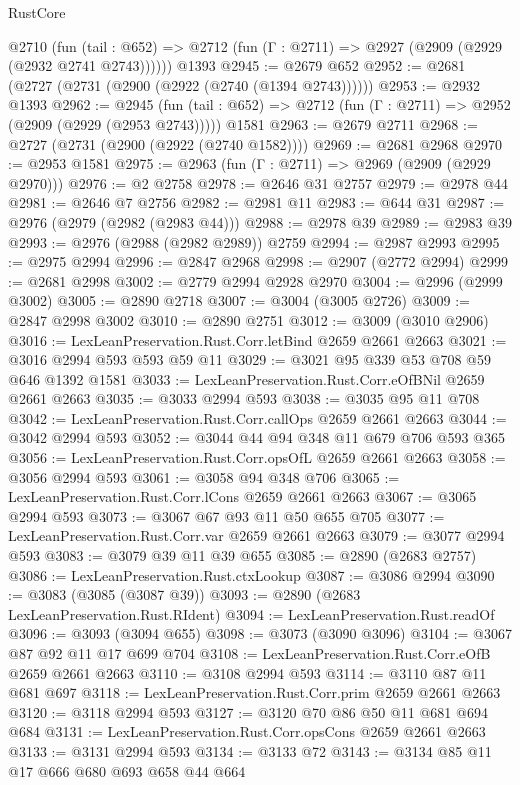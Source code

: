\begin{lexlean}{RustCore}
\begin{coremodule}
    @2710
      (fun (tail : @652) => @2712 (fun (Γ : @2711) => @2927 (@2909 (@2929 (@2932 @2741 @2743))))))
    @1393
@2945 := @2679 @652
@2952 := @2681 (@2727 (@2731 (@2900 (@2922 (@2740 (@1394 @2743))))))
@2953 := @2932 @1393
@2962 := @2945
    (fun (tail : @652) => @2712 (fun (Γ : @2711) => @2952 (@2909 (@2929 (@2953 @2743)))))
    @1581
@2963 := @2679 @2711
@2968 := @2727 (@2731 (@2900 (@2922 (@2740 @1582))))
@2969 := @2681 @2968
@2970 := @2953 @1581
@2975 := @2963 (fun (Γ : @2711) => @2969 (@2909 (@2929 @2970)))
@2976 := @2 @2758
@2978 := @2646 @31 @2757
@2979 := @2978 @44
@2981 := @2646 @7 @2756
@2982 := @2981 @11
@2983 := @644 @31
@2987 := @2976 (@2979 (@2982 (@2983 @44)))
@2988 := @2978 @39
@2989 := @2983 @39
@2993 := @2976 (@2988 (@2982 @2989)) @2759
@2994 := @2987 @2993
@2995 := @2975 @2994
@2996 := @2847 @2968
@2998 := @2907 (@2772 @2994)
@2999 := @2681 @2998
@3002 := @2779 @2994 @2928 @2970
@3004 := @2996 (@2999 @3002)
@3005 := @2890 @2718
@3007 := @3004 (@3005 @2726)
@3009 := @2847 @2998 @3002
@3010 := @2890 @2751
@3012 := @3009 (@3010 @2906)
@3016 := LexLeanPreservation.Rust.Corr.letBind @2659 @2661 @2663
@3021 := @3016 @2994 @593 @593 @59 @11
@3029 := @3021 @95 @339 @53 @708 @59 @646 @1392 @1581
@3033 := LexLeanPreservation.Rust.Corr.eOfBNil @2659 @2661 @2663
@3035 := @3033 @2994 @593
@3038 := @3035 @95 @11 @708
@3042 := LexLeanPreservation.Rust.Corr.callOps @2659 @2661 @2663
@3044 := @3042 @2994 @593
@3052 := @3044 @44 @94 @348 @11 @679 @706 @593 @365
@3056 := LexLeanPreservation.Rust.Corr.opsOfL @2659 @2661 @2663
@3058 := @3056 @2994 @593
@3061 := @3058 @94 @348 @706
@3065 := LexLeanPreservation.Rust.Corr.lCons @2659 @2661 @2663
@3067 := @3065 @2994 @593
@3073 := @3067 @67 @93 @11 @50 @655 @705
@3077 := LexLeanPreservation.Rust.Corr.var @2659 @2661 @2663
@3079 := @3077 @2994 @593
@3083 := @3079 @39 @11 @39 @655
@3085 := @2890 (@2683 @2757)
@3086 := LexLeanPreservation.Rust.ctxLookup
@3087 := @3086 @2994
@3090 := @3083 (@3085 (@3087 @39))
@3093 := @2890 (@2683 LexLeanPreservation.Rust.RIdent)
@3094 := LexLeanPreservation.Rust.readOf
@3096 := @3093 (@3094 @655)
@3098 := @3073 (@3090 @3096)
@3104 := @3067 @87 @92 @11 @17 @699 @704
@3108 := LexLeanPreservation.Rust.Corr.eOfB @2659 @2661 @2663
@3110 := @3108 @2994 @593
@3114 := @3110 @87 @11 @681 @697
@3118 := LexLeanPreservation.Rust.Corr.prim @2659 @2661 @2663
@3120 := @3118 @2994 @593
@3127 := @3120 @70 @86 @50 @11 @681 @694 @684
@3131 := LexLeanPreservation.Rust.Corr.opsCons @2659 @2661 @2663
@3133 := @3131 @2994 @593
@3134 := @3133 @72
@3143 := @3134 @85 @11 @17 @666 @680 @693 @658 @44 @664

\end{coremodule}
\end{lexlean}
